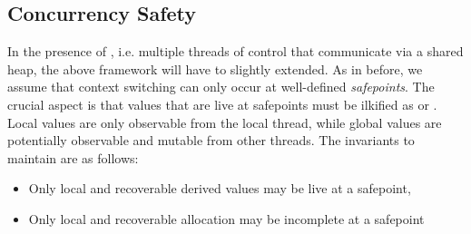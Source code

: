 \subsection{Concurrency Safety}
 In the presence of , i.e. multiple threads
of control that communicate via a shared heap, the above framework
will have to slightly extended.  As in before, we assume that
context switching can only occur at well-defined 
\emph{safepoints}.
The crucial aspect is that values that are live at safepoints must be
ilkified as  or .
Local values are only observable from
the local thread, while global values are potentially observable and mutable
from other threads.  The invariants to maintain are as follows:
\begin{itemize}
 \item Only local and recoverable derived values may be live at a safepoint,  
 \item Only local and recoverable allocation may be incomplete at a safepoint
\end{itemize}
